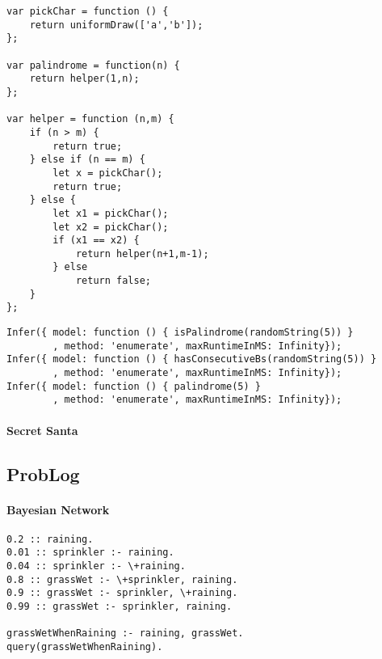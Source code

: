 \begin{verbatim}
var pickChar = function () {
    return uniformDraw(['a','b']);
};

var palindrome = function(n) {
    return helper(1,n);
};

var helper = function (n,m) {
    if (n > m) {
        return true;
    } else if (n == m) {
        let x = pickChar();
        return true;
    } else {
        let x1 = pickChar();
        let x2 = pickChar();
        if (x1 == x2) {
            return helper(n+1,m-1);
        } else
            return false;
    }
};
\end{verbatim}

\begin{verbatim}
Infer({ model: function () { isPalindrome(randomString(5)) }
        , method: 'enumerate', maxRuntimeInMS: Infinity});
Infer({ model: function () { hasConsecutiveBs(randomString(5)) }
        , method: 'enumerate', maxRuntimeInMS: Infinity});
Infer({ model: function () { palindrome(5) }
        , method: 'enumerate', maxRuntimeInMS: Infinity});
\end{verbatim}


\paragraph{Secret Santa}

\subsection{ProbLog}

\paragraph{Bayesian Network}

\begin{verbatim}
0.2 :: raining.
0.01 :: sprinkler :- raining.
0.04 :: sprinkler :- \+raining.
0.8 :: grassWet :- \+sprinkler, raining.
0.9 :: grassWet :- sprinkler, \+raining.
0.99 :: grassWet :- sprinkler, raining.

grassWetWhenRaining :- raining, grassWet.
query(grassWetWhenRaining).
\end{verbatim}

